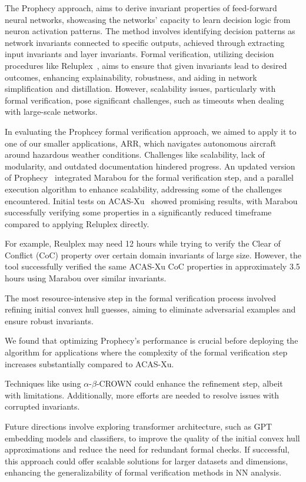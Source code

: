 The Prophecy approach\cite{Gopinath2019FindingII,8952519}, aims to derive invariant properties of feed-forward neural networks, showcasing the networks' capacity to learn decision logic from neuron activation patterns. The method involves identifying decision patterns as network invariants connected to specific outputs, achieved through extracting input invariants and layer invariants. Formal verification, utilizing decision procedures like Reluplex~\cite{10.1007/s10703-021-00363-7}, aims to ensure that given invariants lead to desired outcomes, enhancing explainability, robustness, and aiding in network simplification and distillation. However, scalability issues, particularly with formal verification, pose significant challenges, such as timeouts when dealing with large-scale networks. 

In evaluating the Prophcey formal verification approach, we aimed to apply it to one of our smaller applications, ARR, which navigates autonomous aircraft around hazardous weather conditions. 
Challenges like scalability, lack of modularity, and outdated documentation hindered progress. An updated version of Prophecy~\cite{safednn-nasa} integrated Marabou for the formal verification step, and a parallel execution algorithm to enhance scalability, addressing some of the challenges encountered. Initial tests on ACAS-Xu~\cite{10.1007/978-3-030-62822-2_4} showed promising results, with Marabou successfully verifying some properties in a significantly reduced timeframe compared to applying Reluplex directly. 

For example, Reulplex may need 12 hours while trying to verify the Clear of Conflict (CoC) property over certain domain invariants of large size. However, the tool successfully verified the same ACAS-Xu CoC properties in approximately 3.5 hours using Marabou over similar invariants.

The most resource-intensive step in the formal verification process involved refining initial convex hull guesses, aiming to eliminate adversarial examples and ensure robust invariants. 

We found that optimizing Prophecy's performance is crucial before deploying the algorithm for applications where the complexity of the formal verification step increases substantially compared to ACAS-Xu.

Techniques like using $\alpha$-$\beta$-CROWN could enhance the refinement step, albeit with limitations. %
Additionally, more efforts are needed to resolve issues with corrupted invariants.


Future directions involve exploring transformer architecture, such as GPT embedding models\cite{GPT4} and classifiers, to improve the quality of the initial convex hull approximations and reduce the need for redundant formal checks. If successful, this approach could offer scalable solutions for larger datasets and dimensions, enhancing the generalizability of formal verification methods in NN analysis.